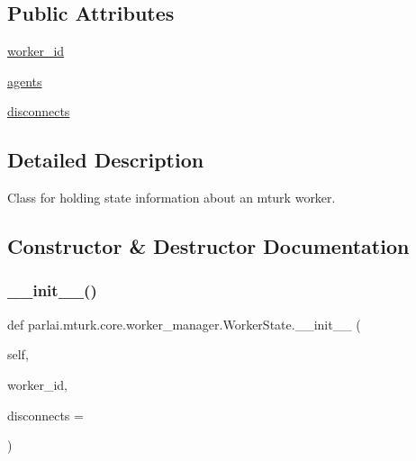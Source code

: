 \subsection*{Public Attributes}
\begin{DoxyCompactItemize}
\item 
\hyperlink{classparlai_1_1mturk_1_1core_1_1worker__manager_1_1WorkerState_a5cb2de9dfc1d8d0b07f693a9e6fabe72}{worker\+\_\+id}
\item 
\hyperlink{classparlai_1_1mturk_1_1core_1_1worker__manager_1_1WorkerState_a53912abee55c0bd1caaf5575c001d575}{agents}
\item 
\hyperlink{classparlai_1_1mturk_1_1core_1_1worker__manager_1_1WorkerState_ab751a2c9f79305a2db1439cd9449006a}{disconnects}
\end{DoxyCompactItemize}


\subsection{Detailed Description}
\begin{DoxyVerb}Class for holding state information about an mturk worker.
\end{DoxyVerb}
 

\subsection{Constructor \& Destructor Documentation}
\mbox{\label{classparlai_1_1mturk_1_1core_1_1worker__manager_1_1WorkerState_a93ec8410562403157cbf3ac4199761ac}} 
\subsubsection{\texorpdfstring{\+\_\+\+\_\+init\+\_\+\+\_\+()}{\_\_init\_\_()}}
{\footnotesize\ttfamily def parlai.\+mturk.\+core.\+worker\+\_\+manager.\+Worker\+State.\+\_\+\+\_\+init\+\_\+\+\_\+ (\begin{DoxyParamCaption}\item[{}]{self,  }\item[{}]{worker\+\_\+id,  }\item[{}]{disconnects = {} }\end{DoxyParamCaption})}

